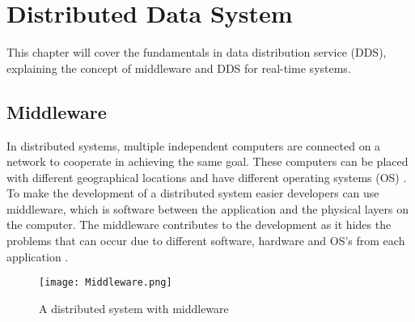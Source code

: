 \documentclass[Main]{subfiles}
\begin{document}
\chapter{Distributed Data System}
This chapter will cover the fundamentals in data distribution service (DDS), explaining the concept of middleware and DDS for real-time systems.
\\
\section{Middleware}
In distributed systems, multiple independent computers are connected on a network to cooperate in achieving the same goal. 
These computers can be placed with different geographical locations and have different operating systems (OS) \cite[p. 2]{Tanenbaum}.
\\ 
To make the development of a distributed system easier developers can use middleware, which is software between the application and the physical layers on the computer. 
The middleware contributes to the development as it hides the problems that can occur due to different software, hardware and OS's from each application \cite[p. 3]{Tanenbaum}.

\begin{figure}[htbp]
\centering
\texttt{[image: Middleware.png]}
\caption{A distributed system with middleware \cite[p. 3]{Tanenbaum}}
\label{Fig:Middleware}
\end{figure}
\end{document}
